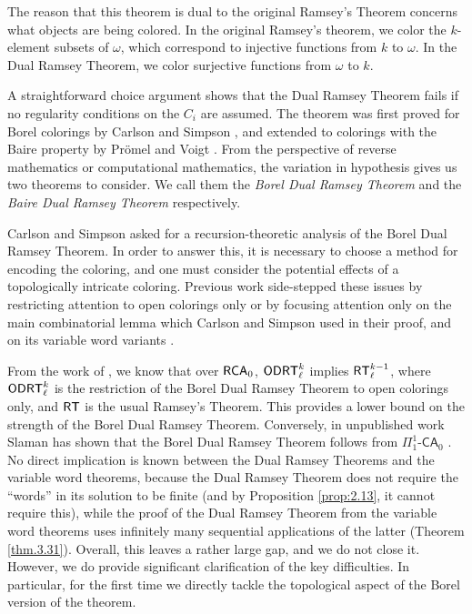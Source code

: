 \documentclass{amsart}
\theoremstyle{definition}
\theoremstyle{remark}
\newcommand{\system}[1]{\mbox{\fontfamily{cmss}\fontshape{n}\fontseries{m}%
    \selectfont#1}}
\newcommand{\RCA}{\system{RCA}\ensuremath{_0}}
\newcommand{\RT}{\system{RT}}
\newcommand{\ODRT}{\system{ODRT}}
\begin{document}
The reason that this theorem is dual to the original Ramsey's Theorem
concerns what objects are being colored.  In the original Ramsey's theorem, 
we color the $k$-element subsets of $\omega$, which correspond to 
injective functions from $k$ to $\omega$.  In the Dual Ramsey Theorem, we color 
surjective functions from $\omega$ to $k$.

A straightforward choice argument shows that the Dual Ramsey Theorem fails if no 
regularity conditions on the $C_i$ are assumed.
The theorem was first
proved for Borel colorings by Carlson and Simpson \cite{cs}, and 
extended to colorings with the Baire property 
by Pr\"{o}mel and Voigt \cite{pv}.  From the perspective of reverse mathematics 
or computational mathematics, the variation in hypothesis gives us two theorems
to consider.  We call them the
\emph{Borel Dual Ramsey Theorem} and the \emph{Baire Dual Ramsey Theorem}
respectively.

Carlson and Simpson asked for a recursion-theoretic analysis of the 
Borel Dual Ramsey Theorem.  In order to answer this, it is necessary to 
choose a method for encoding the coloring, and one must 
consider the potential effects of a topologically intricate coloring.  Previous 
work side-stepped these issues by restricting attention to open colorings only 
\cite{ms} or by focusing attention only on the main combinatorial lemma 
which Carlson and Simpson used in their proof, and on its 
variable word variants \cite{ms, e, LiuMoninPatey}.  

From the work of \cite{ms}, we know that over $\RCA$, 
$\ODRT^{k}_\ell$ implies $\RT^{k-1}_\ell$, where $\ODRT^k_\ell$ is the 
restriction of the Borel Dual Ramsey Theorem to open colorings only,
and $\RT$ is the usual Ramsey's Theorem.
This provides a lower bound on the strength of the Borel Dual Ramsey 
Theorem.  Conversely, in unpublished work Slaman has shown that 
the Borel Dual Ramsey Theorem follows from $\Pi^1_1\text{-}\mathsf{CA}_0$ \cite{slaman}.
No direct implication is known between the Dual Ramsey Theorems
and the variable word theorems, because the Dual
Ramsey Theorem does not require the ``words'' in its solution to be finite
(and by Proposition \ref{prop:2.13}, it cannot require this), 
while the proof of the Dual Ramsey Theorem
from the variable word theorems uses infinitely many sequential applications
of the latter (Theorem \ref{thm.3.31}).
Overall, this leaves a rather large gap, and we do not close it.  However, we do 
provide significant clarification of the key difficulties.
In particular, for the first time
we directly tackle the topological aspect of the Borel version of the 
theorem.  
\end{document}
